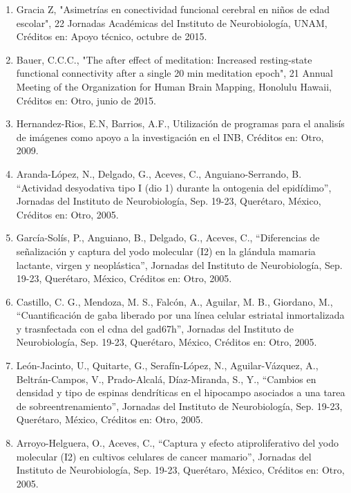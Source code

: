 \begin{enumerate}
\item Gracia Z, "Asimetrías en conectividad funcional cerebral en niños de edad escolar", 22 Jornadas Académicas del Instituto de Neurobiología, UNAM, Créditos 
en: 
Apoyo técnico, octubre de 2015.

\item  Bauer, C.C.C., "The after effect of meditation: Increased resting-state functional connectivity after a single 20 min meditation epoch", 21 Annual Meeting 
of the 
Organization for Human Brain Mapping, Honolulu Hawaii, Créditos en: Otro, junio de 2015.

\item Hernandez-Rios, E.N, Barrios, A.F., Utilización de programas para el analisís de imágenes como apoyo a la investigación en el INB, Créditos en: Otro, 2009.

\item Aranda-López, N., Delgado, G., Aceves, C., Anguiano-Serrando, B. “Actividad desyodativa tipo I (dio 1) durante la ontogenia del epidídimo”, Jornadas del 
Instituto de Neurobiología, Sep. 19-23, Querétaro, México, Créditos en: Otro, 2005.

\item García-Solís, P., Anguiano, B., Delgado, G., Aceves, C., “Diferencias de señalización y captura del yodo molecular (I2) en la glándula mamaria lactante, 
virgen y 
neoplástica”, Jornadas del Instituto de Neurobiología, Sep. 19-23, Querétaro, México, Créditos en: Otro, 2005.

\item Castillo, C. G., Mendoza, M. S., Falcón, A., Aguilar, M. B., Giordano, M., “Cuantificación de gaba liberado por una línea celular estriatal inmortalizada y 
trasnfectada con el cdna del gad67h”, Jornadas del Instituto de Neurobiología, Sep. 19-23, Querétaro, México, Créditos en: Otro, 2005.

\item León-Jacinto, U., Quitarte, G., Serafín-López, N., Aguilar-Vázquez, A., Beltrán-Campos, V., Prado-Alcalá, Díaz-Miranda, S., Y., “Cambios en densidad y tipo 
de 
espinas dendríticas en el hipocampo asociados a una tarea de sobreentrenamiento”, Jornadas del Instituto de Neurobiología, Sep. 19-23, Querétaro, México, 
Créditos en: Otro, 2005.

\item Arroyo-Helguera, O., Aceves, C., “Captura y efecto atiproliferativo del yodo molecular (I2) en cultivos celulares de cancer mamario”, Jornadas del 
Instituto de 
Neurobiología, Sep. 19-23, Querétaro, México, Créditos en: Otro, 2005.


\end{enumerate}
